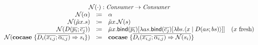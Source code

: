 \documentclass[nonacm]{acmart}
\newcommand{\cut}[2]{\ensuremath{\langle #1 \mid #2 \rangle}}
\newcommand{\cocase}[1]{\ensuremath{\mathbf{cocase}\ \{ #1 \}}}
\newcommand{\name}[1]{\ensuremath{\mathcal{N}(#1)}}
\newcommand{\bind}[2]{\ensuremath{\mathsf{bind}(#1)[#2]}}
\newcommand{\fresh}[1]{\ensuremath{(#1\text{ fresh})}}
\begin{document}
\[\begin{array}{rcll}
    \\
    \multicolumn{4}{c}{\name{\cdot} : \emph{Consumer} \rightarrow \emph{Consumer}}\\
    \name{\alpha} & \coloneq & \alpha & \\
    \name{\tilde{\mu}x.s} & \coloneq & \tilde{\mu}x.\name{s} & \\
    \name{D(\overline{p_i}; \overline{c_j})} & \coloneq & \tilde{\mu}x.\bind{\overline{p_i}}{\lambda as.\bind{\overline{c_j}}{\lambda bs.\cut{x}{D(as; bs)}}} & \fresh{x} \\
    \name{\cocase{\overline{D_i(\overline{x_{i,j}}; \overline{\alpha_{i,j}}) \Rightarrow s_i}}} & \coloneq & \cocase{\overline{D_i(\overline{x_{i,j}}; \overline{\alpha_{i,j}}) \Rightarrow \name{s_i}}} & \\
  \end{array}
\]
\end{document}
